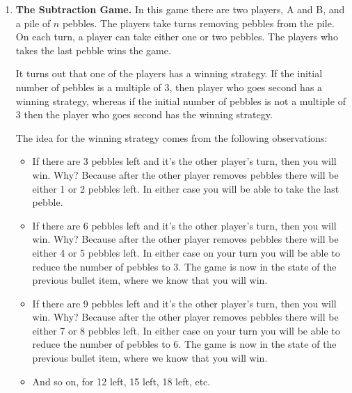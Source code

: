 \documentclass[]{book}
\providecommand{\tightlist}{%
  \setlength{\itemsep}{0pt}\setlength{\parskip}{0pt}}
\theoremstyle{definition}
\theoremstyle{definition}
\theoremstyle{remark}
\begin{document}
{\begin{enumerate}
  \begin{figure}

  {\centering \texttt{[image: r-notes\_files/figure-latex/madhavaGraph-1]} 

  }

  \caption{This is how the output of the     madhavaGraph function should look.}\label{fig:madhavaGraph}
  \end{figure}
\item
  \textbf{The Subtraction Game.} In this game there are two players, A
  and B, and a pile of \(n\) pebbles. The players take turns removing
  pebbles from the pile. On each turn, a player can take either one or
  two pebbles. The players who takes the last pebble wins the game.

  It turns out that one of the players has a winning strategy. If the
  initial number of pebbles is a multiple of 3, then player who goes
  second has a winning strategy, whereas if the initial number of
  pebbles is not a multiple of 3 then the player who goes second has the
  winning strategy.

  The idea for the winning strategy comes from the following
  observations:

  \begin{itemize}
  \tightlist
  \item
    If there are 3 pebbles left and it's the other player's turn, then
    you will win. Why? Because after the other player removes pebbles
    there will be either 1 or 2 pebbles left. In either case you will be
    able to take the last pebble.
  \item
    If there are 6 pebbles left and it's the other player's turn, then
    you will win. Why? Because after the other player removes pebbles
    there will be either 4 or 5 pebbles left. In either case on your
    turn you will be able to reduce the number of pebbles to 3. The game
    is now in the state of the previous bullet item, where we know that
    you will win.
  \item
    If there are 9 pebbles left and it's the other player's turn, then
    you will win. Why? Because after the other player removes pebbles
    there will be either 7 or 8 pebbles left. In either case on your
    turn you will be able to reduce the number of pebbles to 6. The game
    is now in the state of the previous bullet item, where we know that
    you will win.
  \item
    And so on, for 12 left, 15 left, 18 left, etc.
  \end{itemize}


\end{enumerate}}
\end{document}
